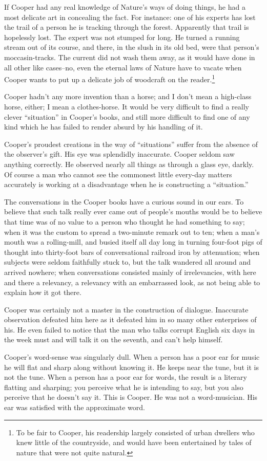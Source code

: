 \documentclass[../demo.tex]{novelette-subdoc}
\begin{document}
If Cooper had any real knowledge of Nature's ways of doing
things, he had a most delicate art in concealing the fact. For instance:
one of his experts has lost the trail of a person he is tracking through the
forest. Apparently that trail is hopelessly lost. The expert was not stumped
for long. He turned a running
stream out of its course, and there, in the slush in its old bed, were
that person's moccasin-tracks. The current did not wash them away, as
it would have done in all other like cases--no, even the eternal laws
of Nature have to vacate when Cooper wants to put up a delicate job of
woodcraft on the reader.\footnote{To be fair to Cooper, his readership
largely consisted of urban dwellers who knew little of the countryside,
and would have been entertained by tales of nature that were not quite
natural.}

Cooper hadn't any more invention than a horse; and I don't mean a
high-class horse, either; I mean a clothes-horse.
It would be very difficult to find a really clever ``situation'' in Cooper's
books, and still more difficult to find one of any kind which he has failed to
render absurd by his handling of it.

Cooper's proudest creations in the way of ``situations'' suffer
from the absence of the observer's gift. His eye was
splendidly inaccurate. Cooper seldom saw anything correctly. He observed
nearly all things as through a glass eye, darkly. Of course a man who
cannot see the commonest little every-day matters accurately is
working at a disadvantage when he is constructing a ``situation.''

The conversations in the Cooper books have a curious sound in our
ears. To believe that such talk really ever came out of people's mouths
would be to believe that time was of no value to
a person who thought he had something to say; when it was the custom
to spread a two-minute remark out to ten; when a man's mouth was a
rolling-mill, and busied itself all day long in turning four-foot pigs
of thought into thirty-foot bars of conversational railroad iron by
attenuation; when subjects were seldom faithfully stuck to, but the talk
wandered all around and arrived nowhere; when conversations consisted
mainly of irrelevancies, with here and there a relevancy, a relevancy
with an embarrassed look, as not being able to explain how it got there.

Cooper was certainly not a master in the construction of dialogue.
Inaccurate observation defeated him here as it defeated him in so many
other enterprises of his. He even failed to notice that the man who
talks corrupt English six days in the week must and will talk it on
the seventh, and can't help himself.

Cooper's word-sense was singularly dull. When a person has a poor ear
for music he will flat and sharp along without knowing it.
He keeps near the tune, but it is not the tune. When a person has a poor
ear for words, the result is a literary flatting and sharping; you
perceive what he is intending to say, but you also perceive that he
doesn't say it. This is Cooper. He was not a word-musician. His ear was
satisfied with the approximate word.
\end{document}
